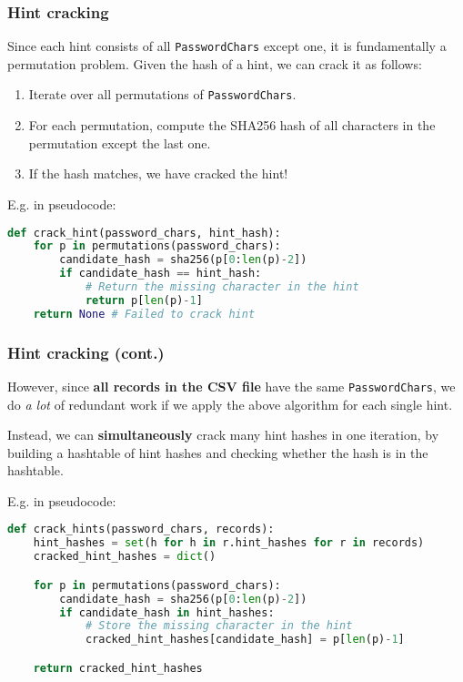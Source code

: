 \documentclass{beamer}
\begin{document}
\begin{frame}[fragile]
	\frametitle{Hint cracking}

	Since each hint consists of all \texttt{PasswordChars} except one, it is fundamentally a permutation problem. Given the hash of a hint, we can crack it as follows:

	\begin{enumerate}
		\item Iterate over all permutations of \texttt{PasswordChars}.
		\item For each permutation, compute the SHA256 hash of all characters in the permutation except the last one.
		\item If the hash matches, we have cracked the hint!
	\end{enumerate}

	\pause

	E.g. in pseudocode:

	\begin{lstlisting}[language=Python]
def crack_hint(password_chars, hint_hash):
    for p in permutations(password_chars):
        candidate_hash = sha256(p[0:len(p)-2])
        if candidate_hash == hint_hash:
            # Return the missing character in the hint
            return p[len(p)-1]
    return None # Failed to crack hint
\end{lstlisting}
\end{frame}

\begin{frame}[fragile]
	\frametitle{Hint cracking (cont.)}

	However, since \textbf{all records in the CSV file} have the same \texttt{PasswordChars}, we do \emph{a lot} of redundant work if we apply the above algorithm for each single hint. \vspace{5mm}

	Instead, we can \textbf{simultaneously} crack many hint hashes in one iteration, by building a hashtable of hint hashes and checking whether the hash is in the hashtable. \vspace{5mm}

	\pause

	E.g. in pseudocode:

	\begin{lstlisting}[language=Python]
def crack_hints(password_chars, records):
    hint_hashes = set(h for h in r.hint_hashes for r in records)
    cracked_hint_hashes = dict()

    for p in permutations(password_chars):
        candidate_hash = sha256(p[0:len(p)-2])
        if candidate_hash in hint_hashes:
            # Store the missing character in the hint
            cracked_hint_hashes[candidate_hash] = p[len(p)-1]

    return cracked_hint_hashes
\end{lstlisting}

\end{frame}
\end{document}
